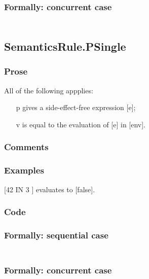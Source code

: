 \documentclass{book}
\begin{document}
  \subsubsection{Formally: concurrent case}
  \begin{align}
  \end{align} 

\subsection{SemanticsRule.PSingle \label{sec:SemanticsRule.PSingle}}

    \subsubsection{Prose}
    All of the following appplies:
    \begin{itemize}
    \item [p] gives a side-effect-free expression [e];
    \item [v] is equal to the evaluation of [e] in [env].
    \end{itemize}

    \subsubsection{Comments}

    \subsubsection{Examples}
    [42 IN { 3 }] evaluates to [false].

  \subsubsection{Code}

  \subsubsection{Formally: sequential case}
  \begin{align}
  \end{align} 

  \subsubsection{Formally: concurrent case}
  \begin{align}
  \end{align} 
\end{document}
